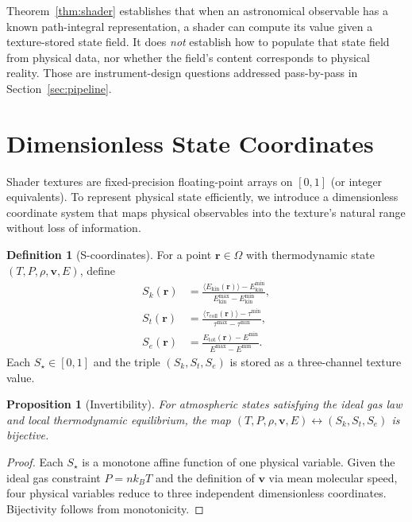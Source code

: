 \documentclass[11pt,twocolumn,a4paper]{article}
\newtheorem{proposition}[theorem]{Proposition}
\theoremstyle{definition}
\newtheorem{definition}[theorem]{Definition}
\theoremstyle{remark}
\newcommand{\Rvec}{\mathbf{r}}
\begin{document}
Theorem~\ref{thm:shader} establishes that when an astronomical observable has a known path-integral representation, a shader can compute its value given a texture-stored state field. It does \emph{not} establish how to populate that state field from physical data, nor whether the field's content corresponds to physical reality. Those are instrument-design questions addressed pass-by-pass in Section~\ref{sec:pipeline}.

\section{Dimensionless State Coordinates}
\label{sec:coords}

Shader textures are fixed-precision floating-point arrays on $[0,1]$ (or integer equivalents). To represent physical state efficiently, we introduce a dimensionless coordinate system that maps physical observables into the texture's natural range without loss of information.

\begin{definition}[S-coordinates]\label{def:scoord}
For a point $\Rvec \in \Omega$ with thermodynamic state $(T, P, \rho, \mathbf{v}, E)$, define
\begin{align}
S_k(\Rvec) &= \frac{\langle E_\text{kin}(\Rvec)\rangle - E_\text{kin}^{\min}}{E_\text{kin}^{\max} - E_\text{kin}^{\min}}, \label{eq:Sk}\\
S_t(\Rvec) &= \frac{\langle \tau_\text{coll}(\Rvec)\rangle - \tau^{\min}}{\tau^{\max} - \tau^{\min}}, \label{eq:St}\\
S_e(\Rvec) &= \frac{E_\text{tot}(\Rvec) - E^{\min}}{E^{\max} - E^{\min}}. \label{eq:Se}
\end{align}
Each $S_\star \in [0,1]$ and the triple $(S_k, S_t, S_e)$ is stored as a three-channel texture value.
\end{definition}

\begin{proposition}[Invertibility]\label{prop:invert}
For atmospheric states satisfying the ideal gas law and local thermodynamic equilibrium, the map $(T, P, \rho, \mathbf{v}, E) \leftrightarrow (S_k, S_t, S_e)$ is bijective.
\end{proposition}

\begin{proof}
Each $S_\star$ is a monotone affine function of one physical variable. Given the ideal gas constraint $P = n k_B T$ and the definition of $\mathbf{v}$ via mean molecular speed, four physical variables reduce to three independent dimensionless coordinates. Bijectivity follows from monotonicity.
\end{proof}
\end{document}
